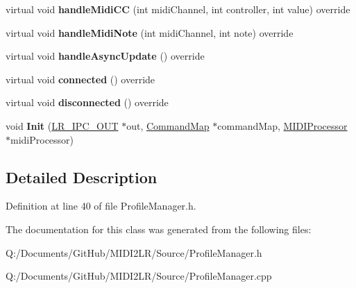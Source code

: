 \begin{DoxyCompactItemize}
\item 
virtual void {\bfseries handle\+Midi\+CC} (int midi\+Channel, int controller, int value) override\hypertarget{class_profile_manager_af96e39d2bbd4b14492698c0ecb39b4e0}{}\label{class_profile_manager_af96e39d2bbd4b14492698c0ecb39b4e0}

\item 
virtual void {\bfseries handle\+Midi\+Note} (int midi\+Channel, int note) override\hypertarget{class_profile_manager_a6515de39866335b7ef722a771767bfb6}{}\label{class_profile_manager_a6515de39866335b7ef722a771767bfb6}

\item 
virtual void {\bfseries handle\+Async\+Update} () override\hypertarget{class_profile_manager_a06dda29b41856d4c2e9e85132a79da5a}{}\label{class_profile_manager_a06dda29b41856d4c2e9e85132a79da5a}

\item 
virtual void {\bfseries connected} () override\hypertarget{class_profile_manager_acdf4ad1cdaf3e5f3178cd48604471117}{}\label{class_profile_manager_acdf4ad1cdaf3e5f3178cd48604471117}

\item 
virtual void {\bfseries disconnected} () override\hypertarget{class_profile_manager_a2012de57ea041dcf2680a824bf68a423}{}\label{class_profile_manager_a2012de57ea041dcf2680a824bf68a423}

\item 
void {\bfseries Init} (\hyperlink{class_l_r___i_p_c___o_u_t}{L\+R\+\_\+\+I\+P\+C\+\_\+\+O\+UT} $\ast$out, \hyperlink{class_command_map}{Command\+Map} $\ast$command\+Map, \hyperlink{class_m_i_d_i_processor}{M\+I\+D\+I\+Processor} $\ast$midi\+Processor)\hypertarget{class_profile_manager_a76dc54676ec7097b7bc8adf0bdfed9b4}{}\label{class_profile_manager_a76dc54676ec7097b7bc8adf0bdfed9b4}

\end{DoxyCompactItemize}


\subsection{Detailed Description}


Definition at line 40 of file Profile\+Manager.\+h.



The documentation for this class was generated from the following files\+:\begin{DoxyCompactItemize}
\item 
Q\+:/\+Documents/\+Git\+Hub/\+M\+I\+D\+I2\+L\+R/\+Source/Profile\+Manager.\+h\item 
Q\+:/\+Documents/\+Git\+Hub/\+M\+I\+D\+I2\+L\+R/\+Source/Profile\+Manager.\+cpp\end{DoxyCompactItemize}

